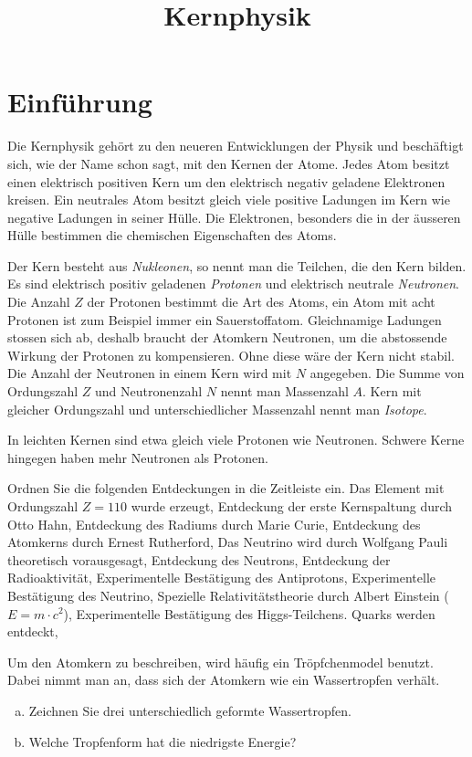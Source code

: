 \documentclass[12pt,a4paper,twoside]{article}
\title{Kernphysik}
\date{}
\begin{document}
\maketitle

\section*{Einführung}
Die Kernphysik gehört zu den neueren Entwicklungen der Physik und beschäftigt sich, wie der Name schon sagt, mit den Kernen der Atome.
Jedes Atom besitzt einen elektrisch positiven Kern um den elektrisch negativ geladene Elektronen kreisen. Ein neutrales Atom besitzt gleich
viele positive Ladungen im Kern wie negative Ladungen in seiner Hülle.
Die Elektronen, besonders die in der äusseren Hülle bestimmen die chemischen Eigenschaften des Atoms.

Der Kern besteht aus \emph{Nukleonen}, so nennt man die Teilchen, die den Kern bilden. 
Es sind elektrisch positiv geladenen \emph{Protonen} und elektrisch neutrale \emph{Neutronen}.
Die Anzahl $Z$ der Protonen bestimmt die Art des Atoms, ein Atom mit acht Protonen ist zum Beispiel immer ein Sauerstoffatom.
Gleichnamige Ladungen stossen sich ab, deshalb braucht der Atomkern Neutronen, um die abstossende Wirkung der Protonen zu kompensieren.
Ohne diese wäre der Kern nicht stabil.
Die Anzahl der Neutronen in einem Kern wird mit $N$ angegeben.
Die Summe von Ordungszahl $Z$ und Neutronenzahl $N$ nennt man Massenzahl $A$.
Kern mit gleicher Ordungszahl und unterschiedlicher Massenzahl nennt man \emph{Isotope}.

In leichten Kernen sind etwa gleich viele Protonen wie Neutronen. 
Schwere Kerne hingegen haben mehr Neutronen als Protonen.

\begin{aufgabe}
	Ordnen Sie die folgenden Entdeckungen in die Zeitleiste ein.
Das Element mit Ordungszahl $Z=110$ wurde erzeugt,
Entdeckung der erste Kernspaltung durch Otto Hahn,
Entdeckung des Radiums durch Marie Curie,
Entdeckung des Atomkerns durch Ernest Rutherford,
Das Neutrino wird durch Wolfgang Pauli theoretisch vorausgesagt,
Entdeckung des Neutrons,
Entdeckung der Radioaktivität,
Experimentelle Bestätigung des Antiprotons,
Experimentelle Bestätigung des Neutrino,
Spezielle Relativitätstheorie durch Albert Einstein ($E=m\cdot c^2$),
Experimentelle Bestätigung des Higgs-Teilchens.
Quarks werden entdeckt,
\end{aufgabe}

\begin{aufgabe}
	Um den Atomkern zu beschreiben, wird häufig ein Tröpfchenmodel benutzt. Dabei nimmt man an, dass sich der Atomkern wie ein Wassertropfen verhält.
	\begin{enumerate} [a)]
		\item Zeichnen Sie drei unterschiedlich geformte Wassertropfen.
		\item Welche Tropfenform hat die niedrigste Energie?
	\end{enumerate}
\end{aufgabe}
\end{document}
